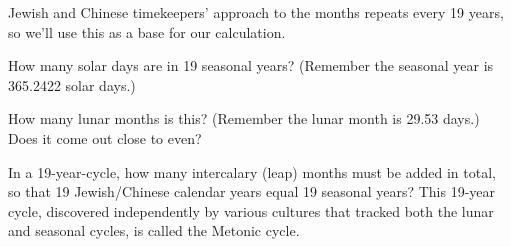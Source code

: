 \documentclass[11pt]{article}
\begin{document}
\vspace{1in}
\underline{\hspace{6in}}


Jewish and Chinese timekeepers' approach to the months repeats every 19 years, so we'll use this as a base for our calculation. 

\bigskip

\begin{minipage}{0.45\textwidth}
	How many solar days are in 19 seasonal years? (Remember the seasonal year is 365.2422 solar days.)
	
	\vspace{1in}
	
	\underline{\hspace{3in}}
\end{minipage}
\hspace{0.1\textwidth}
\begin{minipage}{0.45\textwidth}
	How many lunar months is this? (Remember the lunar month is 29.53 days.) Does it come out close to even?
	
	\vspace{1in}
	
	\underline{\hspace{3in}}
\end{minipage}

In a 19-year-cycle, how many intercalary (leap) months must be added in total, so that 19 Jewish/Chinese calendar years equal 19 seasonal years? This 19-year cycle, discovered independently by various cultures that tracked both the lunar and seasonal cycles, is called the Metonic cycle.

\vspace{1in}
\underline{\hspace{6in}}
\end{document}
